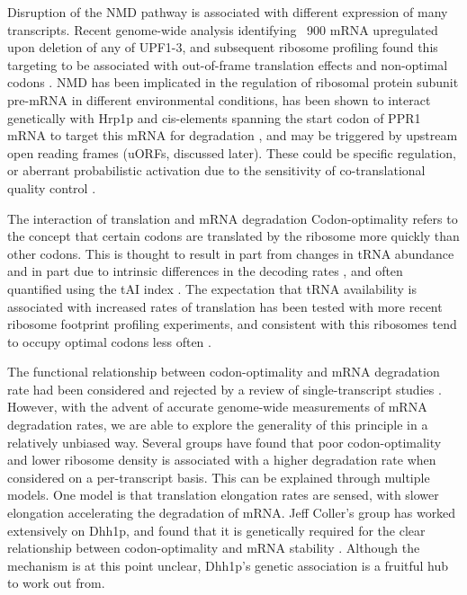 Disruption of the NMD pathway is associated
with different expression of many transcripts. Recent genome-wide
analysis identifying ~900 mRNA upregulated upon deletion of any of
UPF1-3, and subsequent ribosome profiling found this targeting to be
associated with out-of-frame translation effects and non-optimal
codons \parencite{celik2017high}.
NMD has been implicated in the regulation
of ribosomal protein subunit pre-mRNA 
\parencite{garre2013nonsense}
in different
environmental conditions, has been shown to interact genetically with
Hrp1p and cis-elements spanning the start codon of PPR1 mRNA to target
this mRNA for degradation 
\parencite{pierrat19935,kebaara2003upf},
and may be triggered by upstream open reading frames (uORFs, discussed
later). These could be specific regulation, or aberrant probabilistic
activation due to the sensitivity of co-translational quality control
\parencite{celik2017high}.


The interaction of translation and mRNA
degradation Codon-optimality refers to the concept that certain codons
are translated by the ribosome more quickly than other codons. This is
thought to result in part from changes in tRNA abundance and in part
due to intrinsic differences in the decoding rates 
\parencite{curran1989rates,thomas1988codon}, and often quantified using the tAI index
\parencite{reis2004solving}. The expectation that tRNA availability is
associated with increased rates of translation has been tested with
more recent ribosome footprint profiling experiments, and consistent
with this ribosomes tend to occupy optimal codons less often 
\parencite{weinberg2016improved}.  

The functional relationship between codon-optimality
and mRNA degradation rate had been considered and rejected by a review
of single-transcript studies 
\parencite{caponigro1996mechanisms}. However,
with the advent of accurate genome-wide measurements of mRNA
degradation rates, we are able to explore the generality of this
principle in a relatively unbiased way. Several groups 
\parencite{presnyak2015codon,neymotin2016multiple,harigaya2016codon,cheng2017cis}
have found that poor codon-optimality and lower ribosome density
is associated with a higher degradation rate when considered on a
per-transcript basis. This can be explained through multiple models.
One model is that translation elongation rates are sensed, with slower
elongation accelerating the degradation of mRNA. Jeff Coller’s group
has worked extensively on Dhh1p, and found that it is genetically
required for the clear relationship between codon-optimality and mRNA
stability 
\parencite{presnyak2015codon,radhakrishnan2016dead}. Although
the mechanism is at this point unclear, Dhh1p’s genetic association is
a fruitful hub to work out from.  

